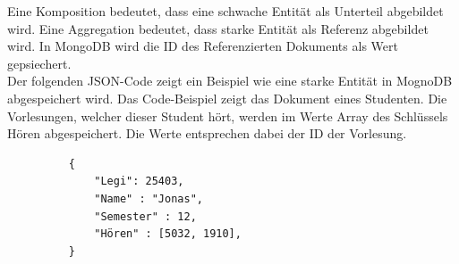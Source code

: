 Eine Komposition bedeutet, dass eine schwache Entität als Unterteil abgebildet
wird. Eine Aggregation bedeutet, dass starke Entität  als Referenz abgebildet
wird. In MongoDB wird die ID des Referenzierten Dokuments als Wert gepsiechert.
\\
Der folgenden JSON-Code zeigt ein Beispiel wie eine starke Entität
in MognoDB abgespeichert wird. Das Code-Beispiel zeigt das Dokument eines
Studenten. Die Vorlesungen, welcher dieser Student hört, werden im Werte Array
des Schlüssels Hören abgespeichert. Die Werte entsprechen dabei der ID der
Vorlesung.
 \begin{figure} [h]
	\begin{verbatim}
	{
		"Legi": 25403,
		"Name" : "Jonas",
		"Semester" : 12,
		"Hören" : [5032, 1910],
	}
	\end{verbatim}
	\label{cod:vorlesung}
\end{figure}


